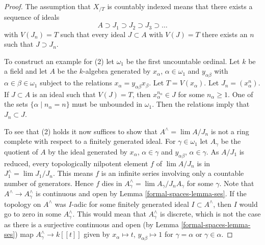 \begin{proof}
The assumption that $X_{/T}$ is countably indexed means that there exists a
sequence of ideals
$$
A \supset J_1 \supset J_2 \supset J_3 \supset \ldots
$$
with $V(J_n) = T$ such that every ideal $J \subset A$ with $V(J) = T$
there exists an $n$ such that $J \supset J_n$.

\medskip\noindent
To construct an example for (2) let $\omega_1$ be the first uncountable
ordinal. Let $k$ be a field and let
$A$ be the $k$-algebra generated by $x_\alpha$, $\alpha \in \omega_1$
and $y_{\alpha \beta}$ with $\alpha \in \beta \in \omega_1$
subject to the relations $x_\alpha = y_{\alpha \beta} x_\beta$.
Let $T = V(x_\alpha)$. Let $J_n = (x_\alpha^n)$.
If $J \subset A$ is an ideal such that
$V(J) = T$, then $x_\alpha^{n_\alpha} \in J$ for some $n_\alpha \geq 1$.
One of the sets $\{\alpha \mid n_\alpha = n\}$ must be unbounded in
$\omega_1$. Then the relations imply that $J_n \subset J$.

\medskip\noindent
To see that (2) holds it now suffices to show that $A^\wedge = \lim A/J_n$
is not a ring complete with respect to a finitely generated ideal.
For $\gamma \in \omega_1$ let $A_\gamma$ be the quotient of $A$
by the ideal generated by $x_\alpha$, $\alpha \in \gamma$ and
$y_{\alpha \beta}$, $\alpha \in \gamma$. As $A/J_1$ is reduced,
every topologically nilpotent element $f$ of $\lim A/J_n$ is in
$J_1^\wedge = \lim J_1/J_n$. This means $f$ is an infinite series
involving only a countable number of generators. Hence $f$ dies in
$A_\gamma^\wedge = \lim A_\gamma/J_nA_\gamma$ for some $\gamma$.
Note that $A^\wedge \to A_\gamma^\wedge$ is continuous and open by
Lemma \ref{formal-spaces-lemma-ses}.
If the topology on $A^\wedge$ was $I$-adic for some finitely generated ideal
$I \subset A^\wedge$, then $I$ would go to zero in some
$A_\gamma^\wedge$. This would mean that $A_\gamma^\wedge$ is discrete,
which is not the case as there is a surjective continuous and open
(by Lemma \ref{formal-spaces-lemma-ses}) map
$A_\gamma^\wedge \to k[[t]]$ given by
$x_\alpha \mapsto t$, $y_{\alpha \beta} \mapsto 1$ for
$\gamma = \alpha$ or $\gamma \in \alpha$.


\end{proof}
